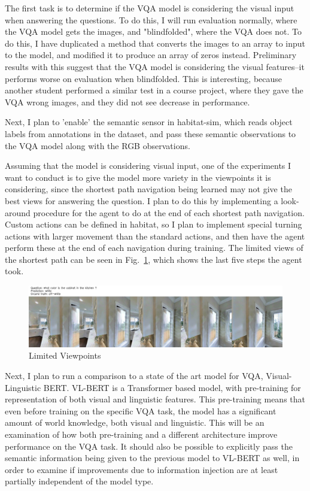 \documentclass{article}
\begin{document}
The first task is to determine if the VQA model is considering the visual input when answering the questions. To do this, I will run evaluation normally, where the VQA model gets the images, and "blindfolded", where the VQA does not. To do this, I have duplicated a method that converts the images to an array to input to the model, and modified it to produce an array of zeros instead. Preliminary results with this suggest that the VQA model is considering the visual features--it performs worse on evaluation when blindfolded. This is interesting, because another student performed a similar test in a course project, where they gave the VQA wrong images, and they did not see decrease in performance. 

Next, I plan to 'enable' the semantic sensor in habitat-sim, which reads object labels from annotations in the dataset, and pass these semantic observations to the VQA model along with the RGB observations. 

Assuming that the model is considering visual input, one of the experiments I want to conduct is to give the model more variety in the viewpoints it is considering, since the shortest path navigation being learned may not give the best views for answering the question\cite{blindfolded}. I plan to do this by implementing a look-around procedure for the agent to do at the end of each shortest path navigation. Custom actions can be defined in habitat, so I plan to implement special turning actions with larger movement than the standard actions, and then have the agent perform these at the end of each navigation during training. The limited views of the shortest path can be seen in Fig.~\ref{fig:viewpoints}, which shows the last five steps the agent took. 

\begin{figure}[h]
	\centering
	\includegraphics[width=\textwidth]{ckpt_0_1093_image.jpg}
	\caption{Limited Viewpoints}
	\label{fig:viewpoints}
\end{figure}
Next, I plan to run a comparison to a state of the art model for VQA, Visual-Linguistic BERT\cite{VLBERT}. VL-BERT is a Transformer based model, with pre-training for representation of both visual and linguistic features. This pre-training means that even before training on the specific VQA task, the model has a significant amount of world knowledge, both visual and linguistic. This will be an examination of how both pre-training and a different architecture improve performance on the VQA task. It should also be possible to explicitly pass the semantic information being given to the previous model to VL-BERT as well, in order to examine if improvements due to information injection are at least partially independent of the model type. 
\end{document}

